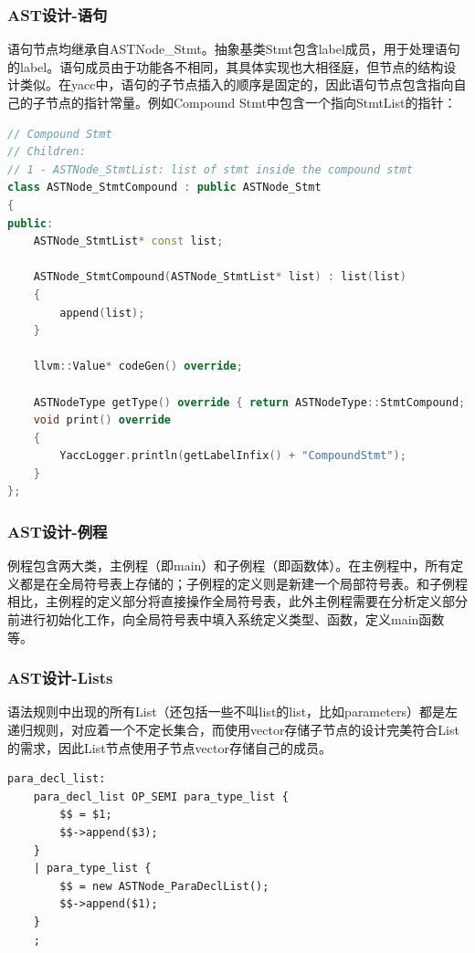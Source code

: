 \documentclass{article}
\begin{document}
\subsubsection{AST设计-语句}
\par 语句节点均继承自ASTNode\_Stmt。抽象基类Stmt包含label成员，用于处理语句的label。语句成员由于功能各不相同，其具体实现也大相径庭，但节点的结构设计类似。在yacc中，语句的子节点插入的顺序是固定的，因此语句节点包含指向自己的子节点的指针常量。例如Compound Stmt中包含一个指向StmtList的指针：
\begin{lstlisting}[language=C++]
// Compound Stmt
// Children:
// 1 - ASTNode_StmtList: list of stmt inside the compound stmt
class ASTNode_StmtCompound : public ASTNode_Stmt
{
public:
    ASTNode_StmtList* const list;

    ASTNode_StmtCompound(ASTNode_StmtList* list) : list(list)
    {
        append(list);
    }

    llvm::Value* codeGen() override;

    ASTNodeType getType() override { return ASTNodeType::StmtCompound; }
    void print() override
    {
        YaccLogger.println(getLabelInfix() + "CompoundStmt");
    }
};
\end{lstlisting}

\subsubsection{AST设计-例程}
\par 例程包含两大类，主例程（即main）和子例程（即函数体）。在主例程中，所有定义都是在全局符号表上存储的；子例程的定义则是新建一个局部符号表。和子例程相比，主例程的定义部分将直接操作全局符号表，此外主例程需要在分析定义部分前进行初始化工作，向全局符号表中填入系统定义类型、函数，定义main函数等。

\subsubsection{AST设计-Lists}
\par 语法规则中出现的所有List（还包括一些不叫list的list，比如parameters）都是左递归规则，对应着一个不定长集合，而使用vector存储子节点的设计完美符合List的需求，因此List节点使用子节点vector存储自己的成员。
\begin{lstlisting}
para_decl_list:
    para_decl_list OP_SEMI para_type_list {
        $$ = $1;
        $$->append($3);
    }
    | para_type_list {
        $$ = new ASTNode_ParaDeclList();
        $$->append($1);
    }
    ;
\end{lstlisting}
\end{document}
